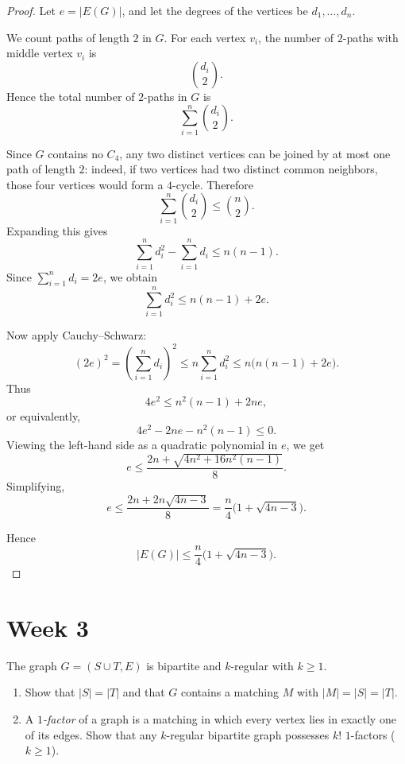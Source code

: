 \documentclass[11pt, a4paper]{ctexrep}
\begin{document}
\begin{proof}
    Let $e=|E(G)|$, and let the degrees of the vertices be $d_1,\dots,d_n$.

    We count paths of length $2$ in $G$.
    For each vertex $v_i$, the number of $2$-paths with middle vertex $v_i$ is
    \[
        \binom{d_i}{2}.
    \]
    Hence the total number of $2$-paths in $G$ is
    \[
        \sum_{i=1}^n \binom{d_i}{2}.
    \]

    Since $G$ contains no $C_4$, any two distinct vertices can be joined by at most one
    path of length $2$: indeed, if two vertices had two distinct common neighbors,
    those four vertices would form a $4$-cycle. Therefore
    \[
        \sum_{i=1}^n \binom{d_i}{2} \le \binom{n}{2}.
    \]
    Expanding this gives
    \[
        \sum_{i=1}^n d_i^2 - \sum_{i=1}^n d_i \le n(n-1).
    \]
    Since $\sum_{i=1}^n d_i = 2e$, we obtain
    \[
        \sum_{i=1}^n d_i^2 \le n(n-1)+2e.
    \]

    Now apply Cauchy--Schwarz:
    \[
        (2e)^2=\left(\sum_{i=1}^n d_i\right)^2 \le n\sum_{i=1}^n d_i^2
        \le n\bigl(n(n-1)+2e\bigr).
    \]
    Thus
    \[
        4e^2 \le n^2(n-1)+2ne,
    \]
    or equivalently,
    \[
        4e^2-2ne-n^2(n-1)\le 0.
    \]
    Viewing the left-hand side as a quadratic polynomial in $e$, we get
    \[
        e \le \frac{2n+\sqrt{4n^2+16n^2(n-1)}}{8}.
    \]
    Simplifying,
    \[
        e \le \frac{2n+2n\sqrt{4n-3}}{8}
        = \frac{n}{4}\bigl(1+\sqrt{4n-3}\bigr).
    \]

    Hence
    \[
        |E(G)|\le \frac{n}{4}\bigl(1+\sqrt{4n-3}\bigr).
    \]
\end{proof}

\section{Week 3}

\begin{exercise}
    The graph $G=(S\cup T,E)$ is bipartite and $k$-regular with $k\ge 1$.
    \begin{enumerate}
        \item[(a)] Show that $|S|=|T|$ and that $G$ contains a matching $M$ with $|M|=|S|=|T|$.
        \item[(b)] A \emph{$1$-factor} of a graph is a matching in which every vertex lies in exactly one of its edges.
              Show that any $k$-regular bipartite graph possesses $k!$ $1$-factors ($k\ge 1$).
    \end{enumerate}
\end{exercise}
\end{document}
